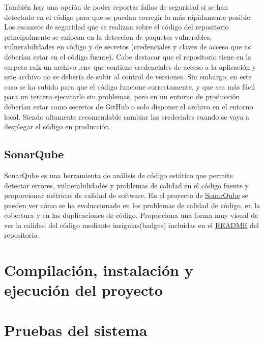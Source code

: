 También hay una opción de poder reportar fallos de seguridad si se han detectado en el código para que se puedan corregir lo más rápidamente posible.
Los escaneos de seguridad que se realizan sobre el código del repositorio principalmente se enfocan en la deteccion de paquetes vulnerables, vulnerabilidades en código y de secretos (credenciales y claves de acceso que no deberían estar en el código fuente).
Cabe destacar que el repositorio tiene en la carpeta raíz un archivo .env que contiene credenciales de acceso a la aplicación y este archivo no se debería de subir al control de versiones. Sin embargo, en este caso se ha subido para que el código funcione correctamente, y que sea más fácil para un tercero ejecutarlo sin problemas, pero en un entorno de producción deberían estar como secretos de GitHub o solo disponer el archivo en el entorno local. Siendo altamente recomendable cambiar las credeciales cuando se vaya a desplegar el código en producción.

\subsection{SonarQube}
\label{subsec:sonarqube}
SonarQube es una herramienta de análisis de código estático que permite detectar errores, vulnerabilidades y problemas de calidad en el código fuente y proporcionar métricas de calidad de software. En el proyecto de \href{https://sonarcloud.io/project/overview?id=CesarRodrigu_GII-24.19-contramedidas-IoT-mediante-reinforcement-learning}{SonarQube} se pueden ver cómo se ha evoluccionado en los problemas de calidad de código, en la cobertura y en las duplicaciones de código. Proporciona una forma muy visual de ver la calidad del código mediante insignias(badges) incluidas en el \href{https://github.com/CesarRodrigu/GII-24.19-contramedidas-IoT-mediante-reinforcement-learning/blob/57-inicio-del-proceso-de-documentaci%C3%B3n-de-la-memoria/README.md}{README} del repositorio.


\section{Compilación, instalación y ejecución del proyecto}
\label{sec:compilacion}


\section{Pruebas del sistema}
\label{sec:pruebas}

